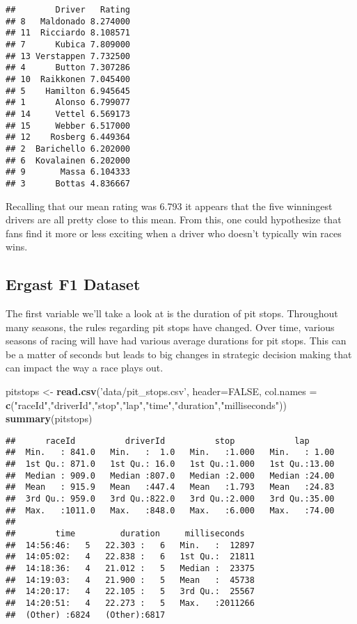 \documentclass[]{article}
\newenvironment{Shaded}{\begin{snugshade}}{\end{snugshade}}
\newcommand{\KeywordTok}[1]{\textcolor[rgb]{0.13,0.29,0.53}{\textbf{#1}}}
\newcommand{\DataTypeTok}[1]{\textcolor[rgb]{0.13,0.29,0.53}{#1}}
\newcommand{\StringTok}[1]{\textcolor[rgb]{0.31,0.60,0.02}{#1}}
\newcommand{\OtherTok}[1]{\textcolor[rgb]{0.56,0.35,0.01}{#1}}
\newcommand{\NormalTok}[1]{#1}
\begin{document}
\begin{verbatim}
##        Driver   Rating
## 8   Maldonado 8.274000
## 11  Ricciardo 8.108571
## 7      Kubica 7.809000
## 13 Verstappen 7.732500
## 4      Button 7.307286
## 10  Raikkonen 7.045400
## 5    Hamilton 6.945645
## 1      Alonso 6.799077
## 14     Vettel 6.569173
## 15     Webber 6.517000
## 12    Rosberg 6.449364
## 2  Barichello 6.202000
## 6  Kovalainen 6.202000
## 9       Massa 6.104333
## 3      Bottas 4.836667
\end{verbatim}

Recalling that our mean rating was 6.793 it appears that the five
winningest drivers are all pretty close to this mean. From this, one
could hypothesize that fans find it more or less exciting when a driver
who doesn't typically win races wins.

\subsection{Ergast F1 Dataset}\label{ergast-f1-dataset}

The first variable we'll take a look at is the duration of pit stops.
Throughout many seasons, the rules regarding pit stops have changed.
Over time, various seasons of racing will have had various average
durations for pit stops. This can be a matter of seconds but leads to
big changes in strategic decision making that can impact the way a race
plays out.

\begin{Shaded}
\begin{Highlighting}[]
\NormalTok{pitstops <-}\StringTok{ }\KeywordTok{read.csv}\NormalTok{(}\StringTok{'data/pit_stops.csv'}\NormalTok{, }\DataTypeTok{header=}\OtherTok{FALSE}\NormalTok{, }\DataTypeTok{col.names =} \KeywordTok{c}\NormalTok{(}\StringTok{"raceId"}\NormalTok{,}\StringTok{"driverId"}\NormalTok{,}\StringTok{"stop"}\NormalTok{,}\StringTok{"lap"}\NormalTok{,}\StringTok{"time"}\NormalTok{,}\StringTok{"duration"}\NormalTok{,}\StringTok{"milliseconds"}\NormalTok{))}
\KeywordTok{summary}\NormalTok{(pitstops)}
\end{Highlighting}
\end{Shaded}

\begin{verbatim}
##      raceId          driverId          stop            lap       
##  Min.   : 841.0   Min.   :  1.0   Min.   :1.000   Min.   : 1.00  
##  1st Qu.: 871.0   1st Qu.: 16.0   1st Qu.:1.000   1st Qu.:13.00  
##  Median : 909.0   Median :807.0   Median :2.000   Median :24.00  
##  Mean   : 915.9   Mean   :447.4   Mean   :1.793   Mean   :24.83  
##  3rd Qu.: 959.0   3rd Qu.:822.0   3rd Qu.:2.000   3rd Qu.:35.00  
##  Max.   :1011.0   Max.   :848.0   Max.   :6.000   Max.   :74.00  
##                                                                  
##        time         duration     milliseconds    
##  14:56:46:   5   22.303 :   6   Min.   :  12897  
##  14:05:02:   4   22.838 :   6   1st Qu.:  21811  
##  14:18:36:   4   21.012 :   5   Median :  23375  
##  14:19:03:   4   21.900 :   5   Mean   :  45738  
##  14:20:17:   4   22.105 :   5   3rd Qu.:  25567  
##  14:20:51:   4   22.273 :   5   Max.   :2011266  
##  (Other) :6824   (Other):6817
\end{verbatim}
\end{document}
